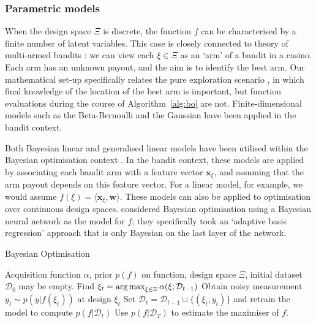 \documentclass[a4paper, 10pt]{report}
\theoremstyle{plain}
\begin{document}
	\subsubsection{Parametric models}
	When the design space $\Xi$ is discrete, the function $f$ can be characterised by a finite number of latent variables.
	This case is closely connected to theory of multi-armed bandits \citep{lai1985asymptotically}: we can view each $\xi\in\Xi$ as an `arm' of a bandit in a casino. Each arm has an unknown payout, and the aim is to identify the best arm.  Our mathematical set-up specifically relates the pure exploration scenario \citep{bubeck2009pure}, in which final knowledge of the location of the best arm is important, but function evaluations during the course of Algorithm~\ref{alg:bo} are not.
	Finite-dimensional models such as the Beta-Bernoulli \citep{shahriari2015taking} and the Gaussian \citep{hoffman2014correlation} have been applied in the bandit context.
	
	Both Bayesian linear and generalised linear models have been utilised within the Bayesian optimisation context \citep{russo2014learning,shahriari2015taking}. In the bandit context, these models are applied by associating each bandit arm with a feature vector $\mathbf{x}_\xi$, and assuming that the arm payout depends on this feature vector. For a linear model, for example, we would assume $f(\xi) = \langle \mathbf{x}_\xi,\mathbf{w} \rangle$. These models can also be applied to optimisation over continuous design spaces.
	\citet{snoek2015scalable} considered Bayesian optimisation using a Bayesian neural network as the model for $f$; they specifically took an `adaptive basis regression' approach that is only Bayesian on the last layer of the network.
	
	
	\begin{algorithm}[t]
		\caption{Bayesian Optimisation \citep{shahriari2015taking}}\label{alg:bo}
		\begin{algorithmic}
			\Require Acquisition function $\alpha$,  prior $p(f)$ on function, design space $\Xi$, initial dataset $\mathcal{D}_0$ may be empty.
			\State Find $\xi_t = \operatorname*{arg\,max}_{\xi\in\Xi} \alpha(\xi ; \mathcal{D}_{t-1})$
			\State Obtain noisy measurement $y_t \sim p(y|f(\xi_t))$ at design $\xi_t$
			\State Set $\mathcal{D}_{t} = \mathcal{D}_{t-1} \cup \{(\xi_t,y_t)\}$ and retrain the model to compute $p(f|\mathcal{D}_t)$
			\EndFor
			\State Use $p(f|\mathcal{D}_{T})$ to estimate the maximiser of $f$.
		\end{algorithmic}
	\end{algorithm}
	
\end{document}
